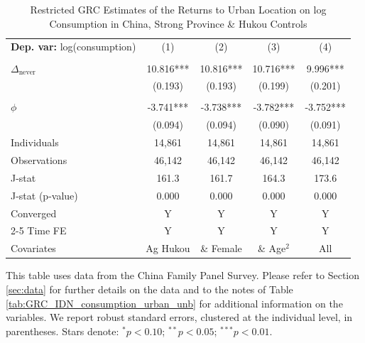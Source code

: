 \begin{table}[htbp] \centering \begin{threeparttable}
 \caption{Restricted GRC Estimates of the Returns to Urban Location on log Consumption in China, Strong Province & Hukou Controls} 
 \label{tab:GRC_CHN_s_hctrl_consumption_urban_unb} 
\begin{tabular}{l cccc} \toprule  \textbf{Dep. var:}  log(consumption) 
                    &\multicolumn{1}{c}{(1)}   &\multicolumn{1}{c}{(2)}   &\multicolumn{1}{c}{(3)}   &\multicolumn{1}{c}{(4)}   \\
                    &               &               &               &               \\
\addlinespace
$\Delta_{\text{never}}$&      10.816***&      10.816***&      10.716***&       9.996***\\
                    &     (0.193)   &     (0.193)   &     (0.199)   &     (0.201)   \\
                    &               &               &               &               \\
\addlinespace
$\phi$              &      -3.741***&      -3.738***&      -3.782***&      -3.752***\\
                    &     (0.094)   &     (0.094)   &     (0.090)   &     (0.091)   \\
\addlinespace
Individuals         &      14,861   &      14,861   &      14,861   &      14,861   \\
Observations        &      46,142   &      46,142   &      46,142   &      46,142   \\
J-stat              &       161.3   &       161.7   &       164.3   &       173.6   \\
J-stat (p-value)    &       0.000   &       0.000   &       0.000   &       0.000   \\
Converged           &           Y   &           Y   &           Y   &           Y   \\
\cmidrule{2-5} Time FE & Y & Y & Y & Y \\ Covariates & Ag Hukou & \& Female & \& Age$^2$ & All \\ \bottomrule \end{tabular} \begin{tablenotes}[flushleft] \footnotesize \item{This table uses data from the China Family Panel Survey. Please refer to Section \ref{sec:data} for further details on the data and to the notes of Table \ref{tab:GRC_IDN_consumption_urban_unb} for additional information on the variables. We report robust standard errors, clustered at the individual level, in parentheses. Stars denote: $^{*} p<0.10$; $^{**} p<0.05$; $^{***} p<0.01$.} \end{tablenotes} \end{threeparttable} \end{table}
